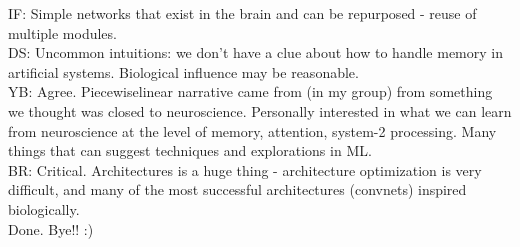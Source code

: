 \documentclass[12pt]{article}
\begin{document}
IF: Simple networks that exist in the brain and can be repurposed - reuse of multiple modules. \\

DS: Uncommon intuitions: we don't have a clue about how to handle memory in artificial systems. Biological influence may be reasonable. \\

YB: Agree. Piecewiselinear narrative came from (in my group) from something we thought was closed to neuroscience. Personally interested in what we can learn from neuroscience at the level of memory, attention, system-2 processing. Many things that can suggest techniques and explorations in ML. \\

BR: Critical. Architectures is a huge thing - architecture optimization is very difficult, and many of the most successful architectures (convnets) inspired biologically. \\

Done. Bye!! :)



\end{document}
